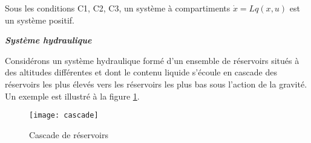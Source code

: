 \begin{theoreme}
Sous les conditions C1, C2, C3, un système à compartiments $\dot x = Lq(x,u)$
est un système positif.
\cqfd
\end{theoreme}
\begin{exemple}\label{systhyd}{\bf \em Système hydraulique}

Considérons un système hydraulique formé d'un ensemble 
de réservoirs situés à des altitudes différentes
et dont le contenu liquide s'écoule \og en cascade \gf
des réservoirs les plus élevés vers les réservoirs les plus bas sous l'action
de la gravité. Un exemple est illustré à la figure \ref{Fig:cascade}.
\begin{figure}[h] 
\begin{center}
\texttt{[image: cascade]}
\caption{Cascade de réservoirs}
\label{Fig:cascade}
\end{center} 
\end{figure}


\end{exemple}
